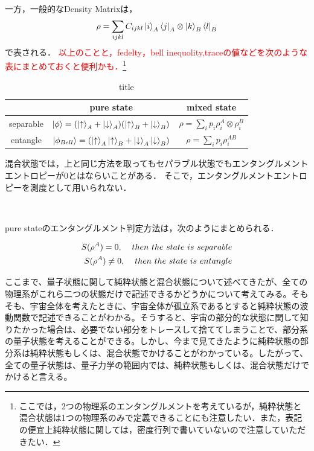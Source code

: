 一方，一般的なDensity Matrixは，
\begin{eqnarray}
\label{40}
\rho=\sum_{ijkl}C_{ijkl}\ket{i}_A\bra{j}_{A}\otimes\ket{k}_B\bra{l}_{B}
\end{eqnarray}
で表される．
\textcolor{red}{以上のことと，fedelty，bell inequolity,traceの値などを次のような表にまとめておくと便利かも．}\footnote{ここでは，2つの物理系のエンタングルメントを考えているが，純粋状態と混合状態は1つの物理系のみで定義できることにも注意したい．また，表記の便宜上純粋状態に関しては，密度行列で書いていないので注意していただきたい．}
{\renewcommand{\arraystretch}{2}
\begin{table}[H]
  \begin{center}
    \begin{tabular}{c|c|c}
       & pure state & mixed state  \\\hline
      separable & $ \ket{\phi}=(\ket{\uparrow}_{A}+\ket{\downarrow}_{A})(\ket{\uparrow}_{B} +\ket{\downarrow}_{B})$ & $\rho=\sum_{i}p_i\rho^{A}_{i}\otimes\rho^{B}_{i}$ \\\hline
      entangle &    $\ket{\phi_{Bell}}=(\ket{\uparrow}_{A}\ket{\uparrow}_{B}+\ket{\downarrow}_{A}\ket{\downarrow}_{B})$  & $\rho=\sum_{i}p_i\rho^{AB}_{i}$
    \end{tabular}
  \end{center}
  \caption{title}
\end{table}}

混合状態では，上と同じ方法を取ってもセパラブル状態でもエンタングルメントエントロピーが$0$とはならいことがある．
そこで，エンタングルメントエントロピーを測度として用いられない．
\begin{empheqboxed}
  \
  \

  pure stateのエンタングルメント判定方法は，次のようにまとめられる．


  \begin{align}
    S(\rho^{A})=0, \hspace{4mm} then\ the\ state\ is\ separable\\
    S(\rho^{A})\neq0, \hspace{4mm} then\ the\ state\ is\ entangle
  \end{align}
\end{empheqboxed}

ここまで、量子状態に関して純粋状態と混合状態について述べてきたが、全ての物理系がこれら二つの状態だけで記述できるかどうかについて考えてみる。そもそも、宇宙全体を考えたときに、宇宙全体が孤立系であるとすると純粋状態の波動関数で記述できることがわかる。そうすると、宇宙の部分的な状態に関して知りたかった場合は、必要でない部分をトレースして捨ててしまうことで、部分系の量子状態を考えることができる。しかし、今まで見てきたように純粋状態の部分系は純粋状態もしくは、混合状態でかけることがわかっている。したがって、全ての量子状態は、量子力学の範囲内では、純粋状態もしくは、混合状態だけでかけると言える。

